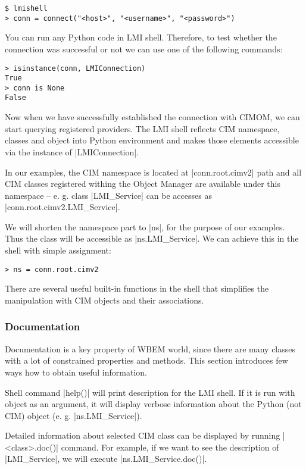\begin{lstlisting}[]
$ lmishell 
> conn = connect("<host>", "<username>", "<password>")
\end{lstlisting}
\funclistend
You can run any Python code in LMI shell. Therefore, to test whether the
connection was successful or not we can use one of the following commands:

\begin{lstlisting}[]
> isinstance(conn, LMIConnection)
True
> conn is None
False
\end{lstlisting}
\funclistend
Now when we have successfully established the connection with CIMOM, we can
start querying registered providers. The LMI shell reflects CIM namespace,
classes and object into Python environment and makes those elements accessible
via the instance of |LMIConnection|.

In our examples, the CIM namespace is located at |conn.root.cimv2| path and all
CIM classes registered withing the Object Manager are available under this
namespace -- e. g. class |LMI_Service| can be accesses as
|conn.root.cimv2.LMI_Service|.

We will shorten the namespace part to |ns|, for the purpose of our examples.
Thus the class will be accessible as |ns.LMI_Service|. We can achieve this in
the shell with simple assignment:

\begin{lstlisting}[]
> ns = conn.root.cimv2
\end{lstlisting}
\funclistend
There are several useful built-in functions in the shell that simplifies the
manipulation with CIM objects and their associations.

\subsubsection{Documentation}
\label{openlmi:shell:examples:documentation}

Documentation is a key property of WBEM world, since there are many classes
with a lot of constrained properties and methods. This section introduces
few ways how to obtain useful information.

Shell command |help()| will print description for the LMI shell. If it
is run with object as an argument, it will display verbose information about
the Python (not CIM) object (e. g. |ns.LMI_Service|).

Detailed information about selected CIM class can be displayed by running
|<class>.doc()| command. For example, if we want to see the description of
|LMI_Service|, we will execute |ns.LMI_Service.doc()|.

